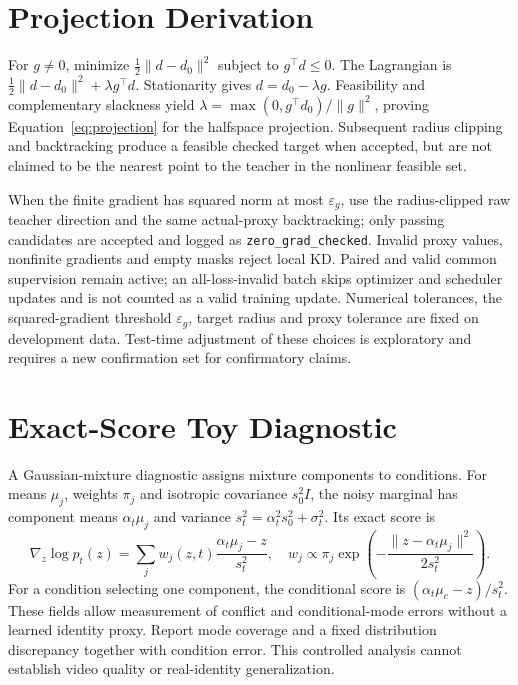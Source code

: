 \documentclass{article}
\begin{document}
\section{Projection Derivation}
For $g\ne0$, minimize $\frac12\|d-d_0\|^2$ subject to $g^\top d\le0$. The Lagrangian is $\frac12\|d-d_0\|^2+\lambda g^\top d$. Stationarity gives $d=d_0-\lambda g$. Feasibility and complementary slackness yield $\lambda=\max(0,g^\top d_0)/\|g\|^2$, proving Equation~\ref{eq:projection} for the halfspace projection. Subsequent radius clipping and backtracking produce a feasible checked target when accepted, but are not claimed to be the nearest point to the teacher in the nonlinear feasible set.

When the finite gradient has squared norm at most $\varepsilon_g$, use the radius-clipped raw teacher direction and the same actual-proxy backtracking; only passing candidates are accepted and logged as \texttt{zero\_grad\_checked}. Invalid proxy values, nonfinite gradients and empty masks reject local KD. Paired and valid common supervision remain active; an all-loss-invalid batch skips optimizer and scheduler updates and is not counted as a valid training update. Numerical tolerances, the squared-gradient threshold $\varepsilon_g$, target radius and proxy tolerance are fixed on development data. Test-time adjustment of these choices is exploratory and requires a new confirmation set for confirmatory claims.

\section{Exact-Score Toy Diagnostic}
A Gaussian-mixture diagnostic assigns mixture components to conditions. For means $\mu_j$, weights $\pi_j$ and isotropic covariance $s_0^2 I$, the noisy marginal has component means $\alpha_t\mu_j$ and variance $s_t^2=\alpha_t^2s_0^2+\sigma_t^2$. Its exact score is
\begin{equation}
 \nabla_z\log p_t(z)=\sum_j w_j(z,t)
 \frac{\alpha_t\mu_j-z}{s_t^2},\quad
 w_j\propto\pi_j\exp\left(-\frac{\|z-\alpha_t\mu_j\|^2}{2s_t^2}\right).
\end{equation}
For a condition selecting one component, the conditional score is $(\alpha_t\mu_c-z)/s_t^2$. These fields allow measurement of conflict and conditional-mode errors without a learned identity proxy. Report mode coverage and a fixed distribution discrepancy together with condition error. This controlled analysis cannot establish video quality or real-identity generalization.
\end{document}
